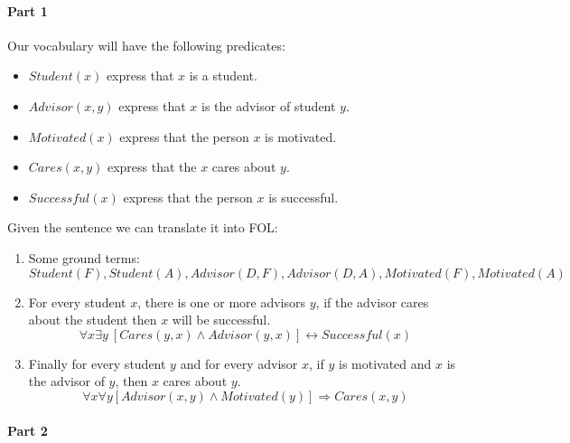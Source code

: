 \documentclass[10pt,a4paper]{article}
\begin{document}
\paragraph{Part 1}

Our vocabulary will have the following predicates:
\begin{itemize}
\item $Student(x)$ express that $x$ is a student.
\item $Advisor(x,y)$ express that $x$ is the advisor of student $y$.
\item $Motivated(x)$ express that the person $x$ is motivated.
\item $Cares(x,y)$ express that the  $x$ cares about $y$.
\item $Successful(x)$ express that the person $x$ is successful.
\end{itemize}


Given the sentence we can translate it into FOL:
\begin{enumerate}
\item Some ground terms:
\[Student(F),Student(A),Advisor(D,F),Advisor(D,A), Motivated(F),Motivated(A)\]
\item For every student $x$, there is one or more advisors $y$, if the advisor cares about the student then $x$ will be successful.
\[\forall x\exists y\ [Cares(y,x)\wedge Advisor(y,x)]\leftrightarrow Successful(x)\]
\item Finally for every student $y$ and for every advisor $x$, if $y$ is motivated and $x$ is the advisor of $y$, then $x$ cares about $y$.
\[\forall x \forall y [Advisor(x,y)\wedge Motivated(y)]\Rightarrow Cares(x,y)\]
\end{enumerate}

\paragraph{Part 2}
\end{document}
